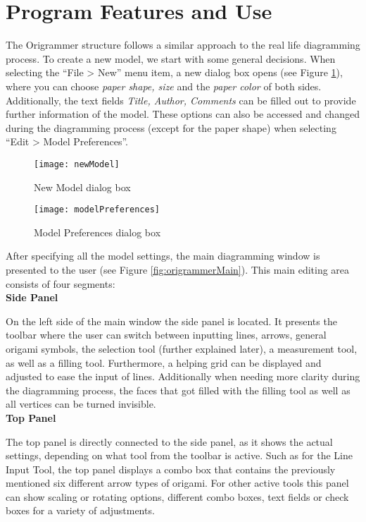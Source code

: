 
\section{Program Features and Use}
\label{program}

The Origrammer structure follows a similar approach to the real life diagramming process. To create a new model, we start with some general decisions. When selecting the ``File > New'' menu item, a new dialog box opens (see Figure \ref{fig:newModel}), where you can choose \emph{paper shape, size} and the \emph{paper color} of both sides. Additionally, the text fields \emph{Title, Author, Comments} can be filled out to provide further information of the model. These options can also be accessed and changed during the diagramming process (except for the paper shape) when selecting ``Edit > Model Preferences''. 

\begin{figure}[h]
	\centering
	\texttt{[image: newModel]}
	\caption{New Model dialog box}
	\label{fig:newModel}
\end{figure}


\begin{figure}[h]
	\centering
	\texttt{[image: modelPreferences]}
	\caption{Model Preferences dialog box}
	\label{fig:modelPreferences}
\end{figure}

After specifying all the model settings, the main diagramming window is presented to the user (see Figure \ref{fig:origrammerMain}). This main editing area consists of four segments:\\


\textbf{Side Panel}

On the left side of the main window the side panel is located. It presents the toolbar where the user can switch between inputting lines, arrows, general origami symbols, the selection tool (further explained later), a measurement tool, as well as a filling tool. Furthermore, a helping grid can be displayed and adjusted to ease the input of lines. Additionally when needing more clarity during the diagramming process, the faces that got filled with the filling tool as well as all vertices can be turned invisible.\\

\textbf{Top Panel}

The top panel is directly connected to the side panel, as it shows the actual settings, depending on what tool from the toolbar is active. Such as for the Line Input Tool, the top panel displays a combo box that contains the previously mentioned six different arrow types of origami. For other active tools this panel can show scaling or rotating options, different combo boxes, text fields or check boxes for a variety of adjustments.\\

